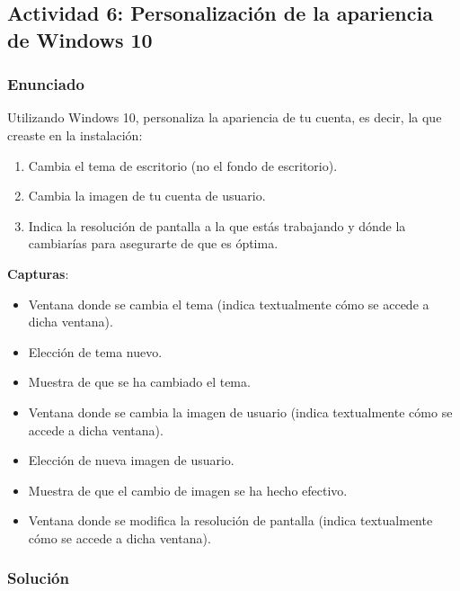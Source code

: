\subsection{Actividad 6: Personalización de la apariencia de Windows 10}

\subsubsection{Enunciado}

Utilizando Windows 10, personaliza la apariencia de tu cuenta, es decir, la que creaste en la instalación:

\begin{enumerate}[label=\alph*.]
    \item Cambia el tema de escritorio (no el fondo de escritorio).
    \item Cambia la imagen de tu cuenta de usuario.
    \item Indica la resolución de pantalla a la que estás trabajando y dónde la cambiarías para asegurarte de que es óptima.
\end{enumerate}

\textbf{Capturas}:
\begin{itemize}
    \item Ventana donde se cambia el tema (indica textualmente cómo se accede a dicha ventana).
    \item Elección de tema nuevo.
    \item Muestra de que se ha cambiado el tema.
    \item Ventana donde se cambia la imagen de usuario (indica textualmente cómo se accede a dicha ventana).
    \item Elección de nueva imagen de usuario.
    \item Muestra de que el cambio de imagen se ha hecho efectivo.
    \item Ventana donde se modifica la resolución de pantalla (indica textualmente cómo se accede a dicha ventana).
\end{itemize}

\subsubsection{Solución}

